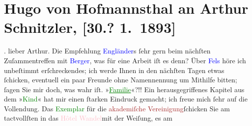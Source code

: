 

               \section[Hugo von Hofmannsthal an Arthur Schnitzler, {[}30.? 1. 1893{]}]{ Hugo von Hofmannsthal an Arthur Schnitzler, {[}30.? 1. 1893{]}}\nopagebreak{}\rehead{ }\normalsize\beginnumbering{} \toendnotes[C]{\smallbreak\pagebreak[2]} 
\toendnotes[C]{\smallbreak}\pstart
           \raggedleft{}{\pb}\label{K_L00165_1v}\label{K_L00165_1h}.\pend
           \pstart{}lieber Arthur.\pend\pstart
           Die Empfehlung \textcolor{blue}{Engländer}{}\ledrightnote{\textcolor{blue}{Peter Altenberg}}s ſehr gern beim nächſten
               Zuſammentreffen mit \textcolor{blue}{Berger}{}\ledrightnote{\textcolor{blue}{Alfred von Berger}}, was für eine Arbeit
               iſt es denn?\pend
           \pstart
           Über \textcolor{blue}{Fels}{}\ledrightnote{\textcolor{blue}{Friedrich Michael Fels}} höre ich unbeſtimmt erſchreckendes; ich
               werde Ihnen in den nächſten Tagen etwas ſchicken, eventuell ein paar Freunde ohne
               Namennennung um Mithilfe bitten; ſagen Sie mir doch, was wahr iſt. »\textcolor{green}{\uline{Familie}}{}\ledrightnote{\textcolor{green}{Familie}}«?!!\pend
           \pstart
           Ein herausgegriffenes Kapitel aus dem »\textcolor{green}{Kind}{}\ledrightnote{\textcolor{green}{Age of Innocence}}« hat
               mir einen ſtarken Eindruck gemacht; ich freue mich ſehr auf die Vollendung.\pend
           \pstart
           Das \textcolor{green}{Exemplar}{} für die \textcolor{brown}{akademiſche Vereinigung}{}\ledrightnote{\textcolor{brown}{Wiener Akademische Vereinigung}}{ }ſchicken Sie am tactvollſten in das \textcolor{pink}{Hôtel Wandel}{}\ledrightnote{\textcolor{pink}{Hotel Wandl}}{ }{\pb}mit der Weiſung, es am
